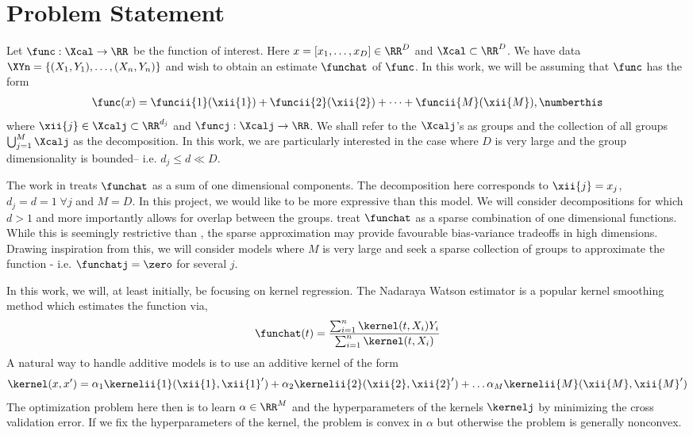 
\section{Problem Statement}
\label{sec:problem}

Let $\func : \Xcal \rightarrow \RR$ be the function of interest. 
Here $x = [x_1, \dots, x_D] \in \RR^D$ and $\Xcal \subset \RR^D$.
We have data $\XYn = \{(X_1, Y_1), \dots, (X_n, Y_n) \}$ and wish to obtain an estimate
$\funchat$ of $\func$.
In this work, we will be assuming that $\func$ has the form
\begin{align*}
\func(x) = \funcii{1}(\xii{1}) + \funcii{2}(\xii{2}) + \dots +
\funcii{M}(\xii{M}),
\numberthis
\label{eqn:addAssumption}
\end{align*}
where $\xii{j} \in \Xcalj \subset \RR^{d_j}$ and $\funcj:\Xcalj \rightarrow
\RR$. We shall refer to the $\Xcalj$'s as groups and the collection of all
groups $\bigcup_{j=1}^M \Xcalj$ as the decomposition.
In this work, we are particularly  interested in the case
where $D$ is very large and the group dimensionality is bounded-- i.e. $d_j \leq
d \ll D$. 

The work in \citet{hastie90gam} treats $\funchat$ as a sum of one
dimensional components. The decomposition here corresponds to
$\xii{j} = x_j$, $d_j = d =1\; \forall j$ and $M = D$. 
In this project, we would like to be more expressive than this model. We will
consider decompositions for which $d > 1$ and more importantly allows for
overlap between the groups.
\citet{ravikumar09spam} treat $\funchat$ as a sparse combination of one
dimensional functions. While this is seemingly restrictive than
\citep{hastie90gam}, the sparse approximation may provide favourable
bias-variance tradeoffs in high dimensions. Drawing inspiration from this, we
will consider models where $M$ is very large and seek a sparse collection of
groups to approximate the function - i.e. $\funchatj = \zero$ for several $j$.

In this work, we will, at least initially, be focusing on kernel regression. The Nadaraya
Watson estimator \cite{tsybakov08nonparametric} is a popular kernel smoothing method which
estimates the function via,
\[
\funchat(t) =  \frac{\sum_{i=1}^n\kernel(t,X_i) Y_i }{\sum_{i=1}^n \kernel(t,X_i)}
\]
A natural way to handle additive models is to use an additive kernel of the form
\[
\kernel(x,x') = 
\alpha_1\kernelii{1}(\xii{1}, {\xii{1}}') +
\alpha_2\kernelii{2}(\xii{2}, {\xii{2}}') + \dots
\alpha_M\kernelii{M}(\xii{M}, {\xii{M}}')
\]
The optimization problem here then is to learn 
$\alpha \in \RR^M$ and the hyperparameters of the kernels $\kernelj$ by minimizing the
cross validation error. If we fix the hyperparameters of the kernel, the problem
is convex in $\alpha$ but otherwise the problem is generally nonconvex.

